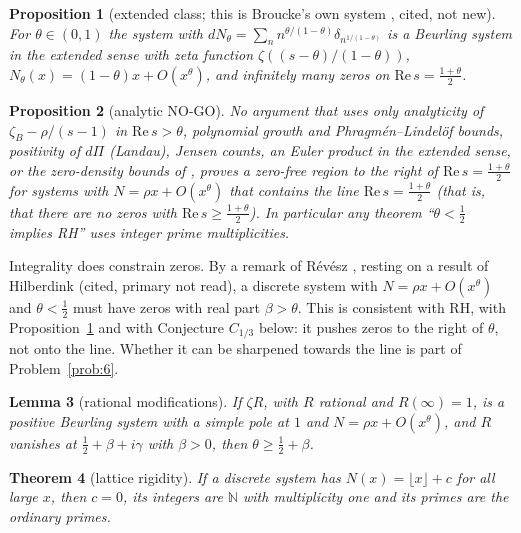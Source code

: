 \documentclass[11pt]{amsart}
\newtheorem{theorem}{Theorem}[section]
\newtheorem{proposition}[theorem]{Proposition}
\newtheorem{lemma}[theorem]{Lemma}
\theoremstyle{definition}
\theoremstyle{remark}
\newcommand{\N}{\mathbb N}
\newcommand{\Rel}{\mathrm{Re}\,}
\begin{document}
\begin{proposition}[extended class; this is Broucke's own system \cite{Broucke2024}, cited, not new]\label{prop:zetatheta}
For $\theta\in(0,1)$ the system with $dN_\theta=\sum_nn^{\theta/(1-\theta)}\delta_{n^{1/(1-\theta)}}$ is a Beurling
system in the extended sense with zeta function $\zeta((s-\theta)/(1-\theta))$, $N_\theta(x)=(1-\theta)x+O(x^\theta)$, and
infinitely many zeros on $\Rel s=\frac{1+\theta}2$.
\end{proposition}

\begin{proposition}[analytic NO-GO]\label{prop:analyticnogo}
No argument that uses only analyticity of $\zeta_B-\rho/(s-1)$ in $\Rel s>\theta$, polynomial growth and
Phragm\'en--Lindel\"of bounds, positivity of $d\Pi$ (Landau), Jensen counts, an Euler product in the extended sense,
or the zero-density bounds of \cite{Broucke2024}, proves a zero-free region to the right of $\Rel s=\frac{1+\theta}2$
for systems with $N=\rho x+O(x^\theta)$ that contains the line $\Rel s=\frac{1+\theta}2$ (that is, that there are no
zeros with $\Rel s\ge\frac{1+\theta}2$). In particular any theorem ``$\theta<\frac12$ implies RH'' uses integer prime
multiplicities.
\end{proposition}

\noindent Integrality does constrain zeros. By a remark of R\'ev\'esz \cite[Rem.~7]{Revesz2023}, resting on a result
of Hilberdink \cite{Hilberdink2010} (cited, primary not read), a discrete system with $N=\rho x+O(x^\theta)$ and
$\theta<\frac12$ must have zeros with real part $\beta>\theta$. This is consistent with RH, with
Proposition~\ref{prop:zetatheta} and with Conjecture $C_{1/3}$ below: it pushes zeros to the right of $\theta$, not onto
the line. Whether it can be sharpened towards the line is part of Problem~\ref{prob:6}.

\begin{lemma}[rational modifications]\label{lem:ratmod}
If $\zeta R$, with $R$ rational and $R(\infty)=1$, is a positive Beurling system with a simple pole at $1$ and
$N=\rho x+O(x^\theta)$, and $R$ vanishes at $\frac12+\beta+i\gamma$ with $\beta>0$, then $\theta\ge\frac12+\beta$.
\end{lemma}

\begin{theorem}[lattice rigidity]\label{thm:latticerig}
If a discrete system has $N(x)=\lfloor x\rfloor+c$ for all large $x$, then $c=0$, its integers are $\N$ with
multiplicity one and its primes are the ordinary primes.
\end{theorem}
\end{document}
